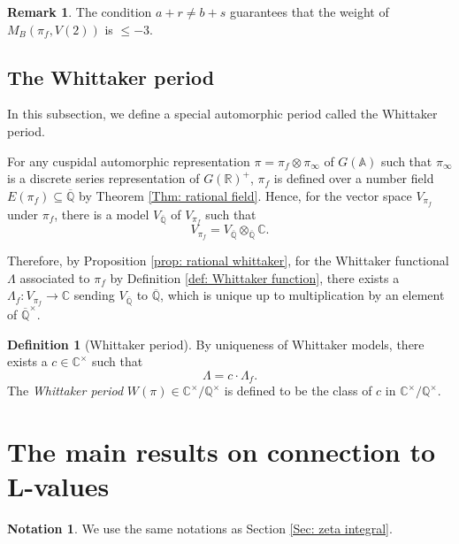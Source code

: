 \documentclass[11pt, a4paper]{amsart}
\theoremstyle{plain}
\theoremstyle{definition}
\newtheorem{definition}[theorem]{Definition}
\newtheorem{remark}[theorem]{Remark}
\newtheorem{notation}[theorem]{Notation}
\numberwithin{equation}{section}
\def\AAA{\mathbb{A}}
\def\CC{\mathbb{C}}
\def\QQ{\mathbb{Q}}
\def\RR{\mathbb{R}}
\begin{document}
\begin{remark}
    The condition $a + r \neq b + s$ guarantees that the weight of $M_B(\pi_f, V(2))$ is $\le -3$. 
\end{remark}

\subsection{The Whittaker period}
\label{SS: Whittaker period}
In this subsection, we define a special automorphic period called the Whittaker period.  

\par For any cuspidal automorphic representation $\pi = \pi_f \otimes \pi_{\infty}$ of $G(\AAA)$ such that $\pi_{\infty}$ is a discrete series representation of $G(\RR)^{+}$, $\pi_{f}$ is defined over a number field $E(\pi_f) \subseteq \overline{\QQ}$ by Theorem \ref{Thm: rational field}. Hence, for the vector space $V_{\pi_f}$ under $\pi_f$, there is a model $V_{\overline{\QQ}}$ of $V_{\pi_f}$ such that 
\begin{equation*}
    V_{\pi_f} = V_{\overline{\QQ}} \otimes_{\overline{\QQ}} \CC.
\end{equation*}

Therefore, by Proposition \ref{prop: rational whittaker}, for the Whittaker functional $\Lambda$ associated to $\pi_f$ by Definition \ref{def: Whittaker function}, there exists a $\Lambda_f \colon V_{\pi_f} \rightarrow \CC$ sending $V_{\overline{\QQ}}$ to $\overline{\QQ}$, which is unique up to multiplication by an element of $\overline{\QQ}^{\times}$. 

\begin{definition}[Whittaker period]
\label{def: Whittaker period}
    By uniqueness of Whittaker models, there exists a $c \in \CC^{\times}$ such that 
    \begin{equation*}
        \Lambda = c \cdot \Lambda_f. 
    \end{equation*}
    The \textit{Whittaker period} $W(\pi) \in \CC^{\times} / \QQ^{\times}$ is defined to be the class of $c$ in $\CC^{\times} / \QQ^{\times}$. 
\end{definition}

\section{The main results on connection to L-values}
\label{Sec: main result}
\begin{notation}
    We use the same notations as Section \ref{Sec: zeta integral}. 
\end{notation}
\end{document}
